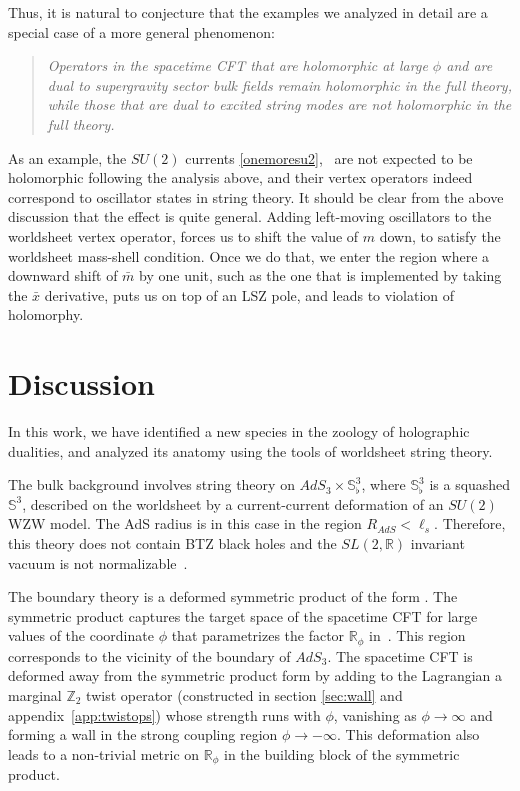 \documentclass[12pt]{article}
\def\lstr{\ell_{\textit{s}}}
\newcommand{\bR}{{\mathbb R}}
\newcommand{\bS}{{\mathbb S}}
\newcommand{\bZ}{{\mathbb Z}}
\numberwithin{equation}{section}
\begin{document}
Thus, it is natural to conjecture that the examples we analyzed in detail are a special case of a more general phenomenon: 
\begin{quote}
{\it Operators in the spacetime CFT that are holomorphic at large $\phi$ and are dual to supergravity sector bulk fields remain holomorphic in the full theory, while those that are dual to excited string modes are not holomorphic in the full theory.}
\end{quote}
As an example, the $SU(2)$ currents \eqref{onemoresu2}, \finalthird\ are not expected to be holomorphic following the analysis above, and their vertex operators indeed correspond to oscillator states in string theory. It should be clear from the above discussion that the effect is quite general. Adding left-moving oscillators to the worldsheet vertex operator, forces us to shift the value of $m$ down, to satisfy the worldsheet mass-shell condition. Once we do that, we enter the region where a downward shift of $\bar m$ by one unit, such as the one that is implemented by taking the $\bar x$ derivative, puts us on top of an LSZ pole, and leads to violation of holomorphy.




\section{Discussion
\label{sec:discussion}}


\label{sec:recap}

In this work, we have identified a new species in the zoology of holographic dualities, and analyzed its anatomy using the tools of worldsheet string theory.  

The bulk background involves string theory on $AdS_3\times \bS^3_\flat$, where $\bS^3_\flat$ is a squashed $\bS^3$, described on the worldsheet by a current-current deformation of an $SU(2)$ WZW model. The AdS radius is in this case in the region $R_{AdS}<\lstr$. Therefore, this theory does not contain BTZ black holes and the $SL(2,\bR)$ invariant vacuum is not normalizable~. 

The boundary theory is a deformed symmetric product of the form \ourcft. The symmetric product captures the target space of the spacetime CFT for large values of the coordinate $\phi$ that parametrizes the factor $\bR_\phi$ in~\ourcft. This region corresponds to the vicinity of the boundary of $AdS_3$. The spacetime CFT is deformed away from the symmetric product form by adding to the Lagrangian a marginal $\bZ_2$ twist operator (constructed in section \ref{sec:wall} and appendix~\ref{app:twistops}) whose strength runs with $\phi$, vanishing as $\phi\to\infty$ and forming a wall in the strong coupling region $\phi\to-\infty$. This deformation also leads to a non-trivial metric on $\bR_\phi$ in the building block of the symmetric product.
\end{document}

